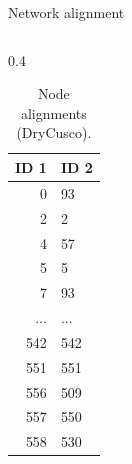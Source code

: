 \documentclass[aspectratio=169]{beamer}
\begin{document}
    \begin{frame}{Network alignment}
        \begin{columns}[t] %
            \begin{column}{0.4\textwidth}
                \begin{table}[htp!]
                    \footnotesize %
                    \centering
                    \caption{Node alignments (DryCusco).}
                    \begin{tabular}{rl}\toprule
                        ID 1 & ID 2 \\\midrule                        
                        0 & 93 \\
                        \rowcolor{yellow}
                        2 & 2 \\
                        4 & 57 \\
                        \rowcolor{yellow}
                        5 & 5 \\
                        7 & 93 \\
                        ... & ... \\
                        \rowcolor{yellow}
                        542 & 542 \\
                        \rowcolor{yellow}
                        551 & 551 \\
                        556 & 509 \\
                        557 & 550 \\
                        558 & 530 \\\bottomrule
                    \end{tabular}
                \end{table}
            \end{column}
            

\end{columns}
\end{frame}
\end{document}
